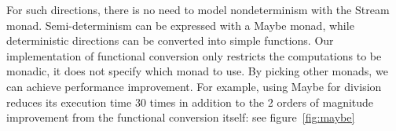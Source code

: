 For such directions, there is no need to model nondeterminism with the Stream monad.
Semi-determinism can be expressed with a Maybe monad, while deterministic directions can be converted into simple functions.
Our implementation of functional conversion only restricts the computations to be monadic, it does not specify which monad to use.
By picking other monads, we can achieve performance improvement.
For example, using Maybe for division reduces its execution time $30$ times in addition to the 2 orders of magnitude improvement from the functional conversion itself: see figure~\ref{fig:maybe}


